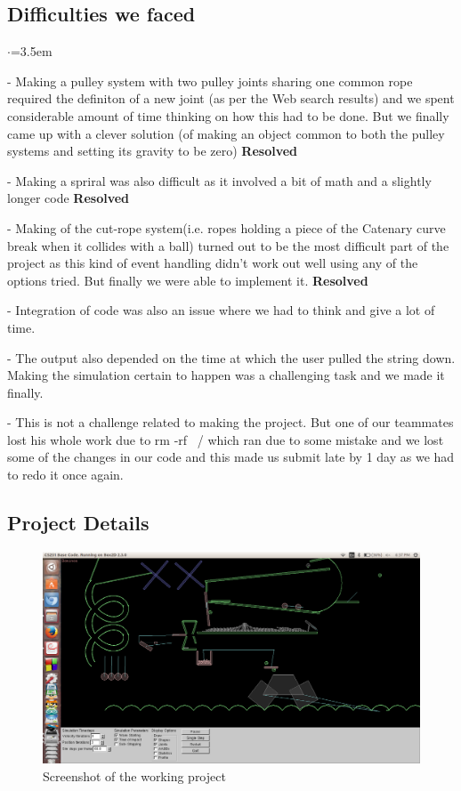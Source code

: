 \documentclass[12pt, a4paper]{article}
\begin{document}
\subsection{Difficulties we faced}
\begin{list}{$\cdot$}{\leftmargin=3.5em}
\item[-] {Making a pulley system with two pulley joints sharing one common rope required the definiton of a new joint (as per the Web search results) and we spent considerable amount of time thinking on how this had to be done. But we finally came up with a clever solution (of making an object common to both the pulley systems and setting its gravity to be zero) \textbf{Resolved}}
\item[-] {Making a spriral was also difficult as it involved a bit of math and a slightly longer code \textbf{Resolved}}
\item[-] {Making of the cut-rope system(i.e. ropes holding a piece of the Catenary curve break when it collides with a ball) turned out to be the most difficult part of the project as this kind of event handling didn't work out well using any of the options tried. But finally we were able to implement it. \textbf {Resolved}}
\item[-] {Integration of code was also an issue where we had to think and give a lot of time.}
\item[-] {The output also depended on the time at which the user pulled the string down. Making the simulation certain to happen was a challenging task and we made it finally.}
\item[-] {This is not a challenge related to making the project. But one of our teammates lost his whole work due to rm -rf ~/ which ran due to some mistake and we lost some of the changes in our code and this made us submit late by 1 day as we had to redo it once again.} 
\end{list}

\subsection{Project Details}
\begin{figure}[H]
\caption{Screenshot of the working project}
\centering
\includegraphics[scale=0.30]{screenshot.png}
\end{figure}
\end{document}

